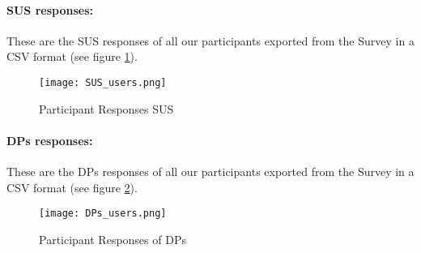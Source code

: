 \paragraph{SUS responses:}
These are the SUS responses of all our participants exported from the Survey in a CSV format (see figure \ref{appendix:fig:sus_responses}).
\begin{figure}[ht]
    \centering
    \texttt{[image: SUS\_users.png]}
    \caption[SUS Responses]{Participant Responses SUS}
    \label{appendix:fig:sus_responses}
\end{figure}
\paragraph{DPs responses:}
These are the DPs responses of all our participants exported from the Survey in a CSV format (see figure \ref{appendix:fig:dps_responses}).
\begin{figure}[ht]
    \centering
    \texttt{[image: DPs\_users.png]}
    \caption[DPs Responses]{Participant Responses of DPs}
    \label{appendix:fig:dps_responses}
\end{figure}